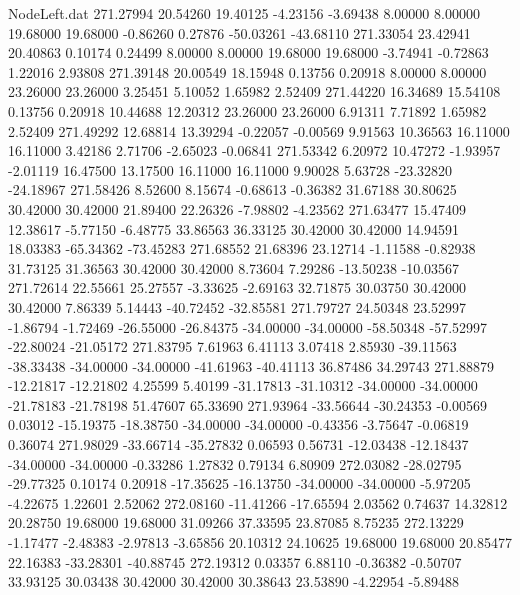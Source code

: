 \begin{filecontents}{NodeLeft.dat}
 271.27994   20.54260   19.40125    -4.23156   -3.69438    8.00000    8.00000   19.68000   19.68000   -0.86260    0.27876  -50.03261  -43.68110
 271.33054   23.42941   20.40863     0.10174    0.24499    8.00000    8.00000   19.68000   19.68000   -3.74941   -0.72863    1.22016    2.93808
 271.39148   20.00549   18.15948     0.13756    0.20918    8.00000    8.00000   23.26000   23.26000    3.25451    5.10052    1.65982    2.52409
 271.44220   16.34689   15.54108     0.13756    0.20918   10.44688   12.20312   23.26000   23.26000    6.91311    7.71892    1.65982    2.52409
 271.49292   12.68814   13.39294    -0.22057   -0.00569    9.91563   10.36563   16.11000   16.11000    3.42186    2.71706   -2.65023   -0.06841
 271.53342    6.20972   10.47272    -1.93957   -2.01119   16.47500   13.17500   16.11000   16.11000    9.90028    5.63728  -23.32820  -24.18967
 271.58426    8.52600    8.15674    -0.68613   -0.36382   31.67188   30.80625   30.42000   30.42000   21.89400   22.26326   -7.98802   -4.23562
 271.63477   15.47409   12.38617    -5.77150   -6.48775   33.86563   36.33125   30.42000   30.42000   14.94591   18.03383  -65.34362  -73.45283
 271.68552   21.68396   23.12714    -1.11588   -0.82938   31.73125   31.36563   30.42000   30.42000    8.73604    7.29286  -13.50238  -10.03567
 271.72614   22.55661   25.27557    -3.33625   -2.69163   32.71875   30.03750   30.42000   30.42000    7.86339    5.14443  -40.72452  -32.85581
 271.79727   24.50348   23.52997    -1.86794   -1.72469  -26.55000  -26.84375  -34.00000  -34.00000  -58.50348  -57.52997  -22.80024  -21.05172
 271.83795    7.61963    6.41113     3.07418    2.85930  -39.11563  -38.33438  -34.00000  -34.00000  -41.61963  -40.41113   36.87486   34.29743
 271.88879  -12.21817  -12.21802     4.25599    5.40199  -31.17813  -31.10312  -34.00000  -34.00000  -21.78183  -21.78198   51.47607   65.33690
 271.93964  -33.56644  -30.24353    -0.00569    0.03012  -15.19375  -18.38750  -34.00000  -34.00000   -0.43356   -3.75647   -0.06819    0.36074
 271.98029  -33.66714  -35.27832     0.06593    0.56731  -12.03438  -12.18437  -34.00000  -34.00000   -0.33286    1.27832    0.79134    6.80909
 272.03082  -28.02795  -29.77325     0.10174    0.20918  -17.35625  -16.13750  -34.00000  -34.00000   -5.97205   -4.22675    1.22601    2.52062
 272.08160  -11.41266  -17.65594     2.03562    0.74637   14.32812   20.28750   19.68000   19.68000   31.09266   37.33595   23.87085    8.75235
 272.13229   -1.17477   -2.48383    -2.97813   -3.65856   20.10312   24.10625   19.68000   19.68000   20.85477   22.16383  -33.28301  -40.88745
 272.19312    0.03357    6.88110    -0.36382   -0.50707   33.93125   30.03438   30.42000   30.42000   30.38643   23.53890   -4.22954   -5.89488

\end{filecontents}
